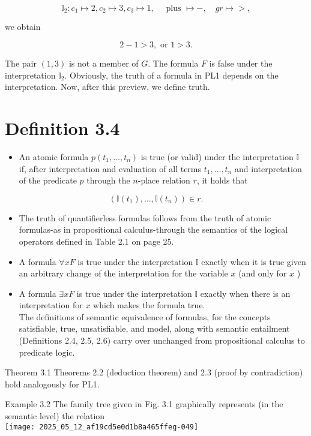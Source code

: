 \documentclass[10pt]{article}
\begin{document}
$$
\mathbb{I}_{2}: c_{1} \mapsto 2, c_{2} \mapsto 3, c_{3} \mapsto 1, \quad \text { plus } \mapsto-, \quad g r \mapsto>,
$$

we obtain

$$
2-1>3, \text { or } 1>3 .
$$

The pair $(1,3)$ is not a member of $G$. The formula $F$ is false under the interpretation $\mathbb{I}_{2}$. Obviously, the truth of a formula in PL1 depends on the interpretation. Now, after this preview, we define truth.

\section*{Definition 3.4}
\begin{itemize}
  \item An atomic formula $p\left(t_{1}, \ldots, t_{n}\right)$ is true (or valid) under the interpretation $\mathbb{I}$ if, after interpretation and evaluation of all terms $t_{1}, \ldots, t_{n}$ and interpretation of the predicate $p$ through the $n$-place relation $r$, it holds that
\end{itemize}

$$
\left(\mathbb{I}\left(t_{1}\right), \ldots, \mathbb{I}\left(t_{n}\right)\right) \in r .
$$

\begin{itemize}
  \item The truth of quantifierless formulas follows from the truth of atomic formulas-as in propositional calculus-through the semantics of the logical operators defined in Table 2.1 on page 25.
  \item A formula $\forall x F$ is true under the interpretation $\mathbb{I}$ exactly when it is true given an arbitrary change of the interpretation for the variable $x$ (and only for $x$ )
  \item A formula $\exists x F$ is true under the interpretation $\mathbb{I}$ exactly when there is an interpretation for $x$ which makes the formula true.\\
The definitions of semantic equivalence of formulas, for the concepts satisfiable, true, unsatisfiable, and model, along with semantic entailment (Definitions 2.4, 2.5, 2.6) carry over unchanged from propositional calculus to predicate logic.
\end{itemize}

Theorem 3.1 Theorems 2.2 (deduction theorem) and 2.3 (proof by contradiction) hold analogously for PL1.

Example 3.2 The family tree given in Fig. 3.1 graphically represents (in the semantic level) the relation\\
\texttt{[image: 2025\_05\_12\_af19cd5e0d1b8a465ffeg-049]}
\end{document}
